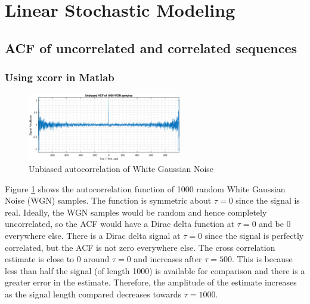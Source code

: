 


% 


\section{Linear Stochastic Modeling}
\vspace{0.5cm}


\subsection{ACF of uncorrelated and correlated sequences}


\subsubsection{Using xcorr in Matlab}

\begin{figure}[h!]
\centering
\includegraphics[width=0.6\textwidth]{acf_uncorr}
\caption{\label{fig:acf_uncorr} Unbiased autocorrelation of White Gaussian Noise}
\end{figure}

Figure \ref{fig:acf_uncorr} shows the autocorrelation function of 1000 random White Gaussian Noise (WGN) samples. The function is symmetric about $\tau=0$ since the signal is real. Ideally, the WGN samples would be random and hence completely uncorrelated, so the ACF would have a Dirac delta function at $\tau=0$ and be 0 everywhere else. There is a Dirac delta signal at $\tau=0$ since the signal is perfectly correlated, but the ACF is not zero everywhere else. The cross correlation estimate is close to 0 around $\tau=0$ and increases after $\tau=500$. This is because less than half the signal (of length 1000) is available for comparison and there is a greater error in the estimate. Therefore, the amplitude of the estimate increases as the signal length compared decreases towards $\tau=1000$.

